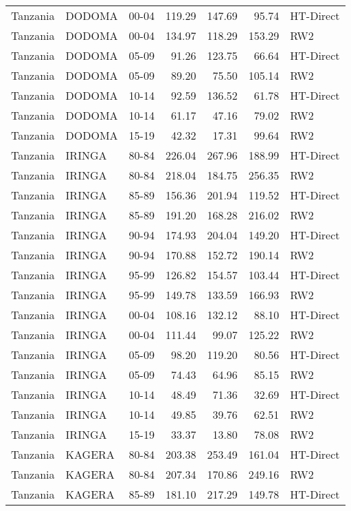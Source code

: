 \begin{longtable}{lllrrrl}
  Tanzania & DODOMA & 00-04 & 119.29 & 147.69 & 95.74 & HT-Direct \\ 
  Tanzania & DODOMA & 00-04 & 134.97 & 118.29 & 153.29 & RW2 \\ 
  Tanzania & DODOMA & 05-09 & 91.26 & 123.75 & 66.64 & HT-Direct \\ 
  Tanzania & DODOMA & 05-09 & 89.20 & 75.50 & 105.14 & RW2 \\ 
  Tanzania & DODOMA & 10-14 & 92.59 & 136.52 & 61.78 & HT-Direct \\ 
  Tanzania & DODOMA & 10-14 & 61.17 & 47.16 & 79.02 & RW2 \\ 
  Tanzania & DODOMA & 15-19 & 42.32 & 17.31 & 99.64 & RW2 \\ 
  Tanzania & IRINGA & 80-84 & 226.04 & 267.96 & 188.99 & HT-Direct \\ 
  Tanzania & IRINGA & 80-84 & 218.04 & 184.75 & 256.35 & RW2 \\ 
  Tanzania & IRINGA & 85-89 & 156.36 & 201.94 & 119.52 & HT-Direct \\ 
  Tanzania & IRINGA & 85-89 & 191.20 & 168.28 & 216.02 & RW2 \\ 
  Tanzania & IRINGA & 90-94 & 174.93 & 204.04 & 149.20 & HT-Direct \\ 
  Tanzania & IRINGA & 90-94 & 170.88 & 152.72 & 190.14 & RW2 \\ 
  Tanzania & IRINGA & 95-99 & 126.82 & 154.57 & 103.44 & HT-Direct \\ 
  Tanzania & IRINGA & 95-99 & 149.78 & 133.59 & 166.93 & RW2 \\ 
  Tanzania & IRINGA & 00-04 & 108.16 & 132.12 & 88.10 & HT-Direct \\ 
  Tanzania & IRINGA & 00-04 & 111.44 & 99.07 & 125.22 & RW2 \\ 
  Tanzania & IRINGA & 05-09 & 98.20 & 119.20 & 80.56 & HT-Direct \\ 
  Tanzania & IRINGA & 05-09 & 74.43 & 64.96 & 85.15 & RW2 \\ 
  Tanzania & IRINGA & 10-14 & 48.49 & 71.36 & 32.69 & HT-Direct \\ 
  Tanzania & IRINGA & 10-14 & 49.85 & 39.76 & 62.51 & RW2 \\ 
  Tanzania & IRINGA & 15-19 & 33.37 & 13.80 & 78.08 & RW2 \\ 
  Tanzania & KAGERA & 80-84 & 203.38 & 253.49 & 161.04 & HT-Direct \\ 
  Tanzania & KAGERA & 80-84 & 207.34 & 170.86 & 249.16 & RW2 \\ 
  Tanzania & KAGERA & 85-89 & 181.10 & 217.29 & 149.78 & HT-Direct \\ 

\end{longtable}
